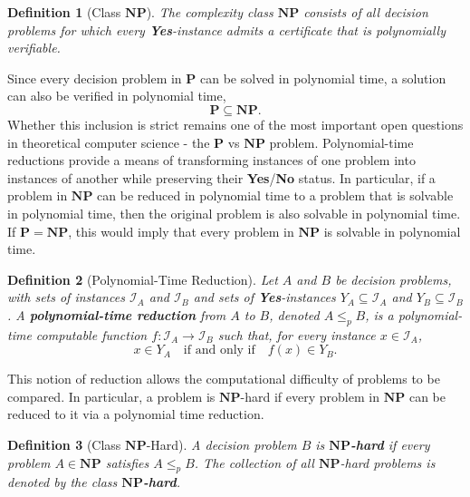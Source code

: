\documentclass[11pt]{report}
\newtheorem{definition}{Definition}[section]
\begin{document}
\begin{definition}[Class $\mathbf{NP}$] \label{def::class_np}
  The complexity class $\mathbf{NP}$ consists of all decision problems for which every \textbf{Yes}-instance admits a certificate that is polynomially verifiable.
\end{definition}

Since every decision problem in $\mathbf{P}$ can be solved in polynomial time, a solution can also be verified in polynomial time,
\[
\mathbf{P} \subseteq \mathbf{NP}.
\]
Whether this inclusion is strict remains one of the most important open questions in theoretical computer science - the $\mathbf{P}$ vs $\mathbf{NP}$ problem.  Polynomial-time reductions provide a means of transforming instances of one problem into instances of another while preserving their \textbf{Yes}/\textbf{No} status. In particular, if a problem in $\mathbf{NP}$ can be reduced in polynomial time to a problem that is solvable in polynomial time, then the original
problem is also solvable in polynomial time. If $\mathbf{P}=\mathbf{NP}$, this would imply that every problem in $\mathbf{NP}$ is solvable in polynomial time.

\begin{definition}[Polynomial-Time Reduction] \label{def::polynomial_time_reduction}
  Let $A$ and $B$ be decision problems, with sets of instances
  $\mathcal{I}_A$ and $\mathcal{I}_B$ and sets of \textbf{Yes}-instances $Y_A \subseteq \mathcal{I}_A$ and $Y_B \subseteq \mathcal{I}_B$. A \textbf{polynomial-time reduction} from $A$ to $B$, denoted $A \leq_p B$, is a polynomial-time computable function $f \colon \mathcal{I}_A \rightarrow \mathcal{I}_B$ such that, for every instance $x \in \mathcal{I}_A$,
  \[
  x \in Y_A \quad \text{if and only if} \quad f(x) \in Y_B.
  \]
\end{definition}

This notion of reduction allows the computational difficulty of problems to be compared. In particular, a problem is $\mathbf{NP}$-hard if every problem in $\mathbf{NP}$ can be reduced to it via a polynomial time reduction.

\begin{definition}[Class $\mathbf{NP}$-Hard] \label{def::class_np_hard}
  A decision problem $B$ is \textbf{$\mathbf{NP}$-hard} if every problem $A \in \mathbf{NP}$ satisfies $A \leq_p B$. The collection of all $\mathbf{NP}$-hard problems is denoted by the class \textbf{$\mathbf{NP}$-hard}.
\end{definition}
\end{document}
